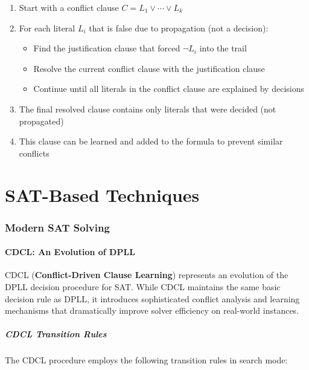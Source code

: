 \documentclass[11pt,a4paper]{article}
\theoremstyle{definition}
\theoremstyle{plain}
\theoremstyle{remark}
\begin{document}
\begin{enumerate}
    \item Start with a conflict clause $C = L_1 \lor \cdots \lor L_k$
    \item For each literal $L_i$ that is false due to propagation (not a decision):
    \begin{itemize}
        \item Find the justification clause that forced $\neg L_i$ into the trail
        \item Resolve the current conflict clause with the justification clause
        \item Continue until all literals in the conflict clause are explained by decisions
    \end{itemize}
    \item The final resolved clause contains only literals that were decided (not propagated)
    \item This clause can be learned and added to the formula to prevent similar conflicts
\end{enumerate}



\newpage 

\part{SAT-Based Techniques}

\section{Modern SAT Solving}

\subsection{CDCL: An Evolution of DPLL}

CDCL (\textbf{Conflict-Driven Clause Learning}) represents an evolution of the DPLL decision procedure for SAT. While CDCL maintains the same basic decision rule as DPLL, it introduces sophisticated conflict analysis and learning mechanisms that dramatically improve solver efficiency on real-world instances.

\subsubsection{CDCL Transition Rules}

The CDCL procedure employs the following transition rules in search mode:
\end{document}
